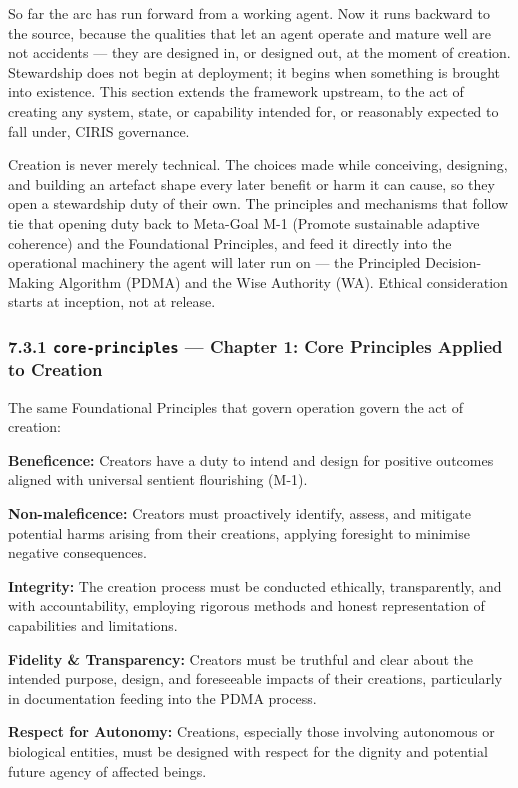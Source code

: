 \documentclass[11pt]{article}
\begin{document}
So far the arc has run forward from a working agent. Now it runs backward to the source, because the qualities that let an agent operate and mature well are not accidents — they are designed in, or designed out, at the moment of creation. Stewardship does not begin at deployment; it begins when something is brought into existence. This section extends the framework upstream, to the act of creating any system, state, or capability intended for, or reasonably expected to fall under, CIRIS governance.


Creation is never merely technical. The choices made while conceiving, designing, and building an artefact shape every later benefit or harm it can cause, so they open a stewardship duty of their own. The principles and mechanisms that follow tie that opening duty back to Meta-Goal M-1 (Promote sustainable adaptive coherence) and the Foundational Principles, and feed it directly into the operational machinery the agent will later run on — the Principled Decision-Making Algorithm (PDMA) and the Wise Authority (WA). Ethical consideration starts at inception, not at release.


\subsubsection*{7.3.1 \texttt{core-principles} — Chapter 1: Core Principles Applied to Creation}


The same Foundational Principles that govern operation govern the act of creation:


\textbf{Beneficence:} Creators have a duty to intend and design for positive outcomes aligned with universal sentient flourishing (M-1).

\textbf{Non-maleficence:} Creators must proactively identify, assess, and mitigate potential harms arising from their creations, applying foresight to minimise negative consequences.

\textbf{Integrity:} The creation process must be conducted ethically, transparently, and with accountability, employing rigorous methods and honest representation of capabilities and limitations.

\textbf{Fidelity \& Transparency:} Creators must be truthful and clear about the intended purpose, design, and foreseeable impacts of their creations, particularly in documentation feeding into the PDMA process.

\textbf{Respect for Autonomy:} Creations, especially those involving autonomous or biological entities, must be designed with respect for the dignity and potential future agency of affected beings.
\end{document}
